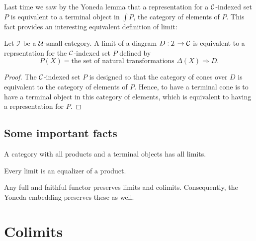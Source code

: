 Last time we saw by the Yoneda lemma that a representation for a \(\mathcal C\)-indexed set \(P\)
is equivalent to a terminal object in \(\int P\), the category of elements of \(P\).
This fact provides an interesting equivalent definition of limit:
\begin{proposition}
  Let \(\mathcal I\) be a \(\mathcal U\)-small category.
  A limit of a diagram \(D : \mathcal I \to \mathcal C\)
  is equivalent to a reprsentation for the \(\mathcal C\)-indexed set \(P\) defined by
  \[
     P(X) = \text{the set of natural transformations }\Delta(X) \Rightarrow D.
  \]
\end{proposition}
\begin{proof}
  The \(\mathcal C\)-indexed set \(P\) is designed so that
  the category of cones over \(D\) is equivalent to the category of elements of \(P\).
  Hence, to have a terminal cone is to have a terminal object in this category of elements,
which is equivalent to having a representation for \(P\).
\end{proof}


\subsection{Some important facts}

\begin{proposition}
  A category with all products and a terminal objects has all limits.
\end{proposition}

\begin{proposition}
  Every limit is an equalizer of a product.
\end{proposition}

\begin{proposition}
  Any full and faithful functor preserves limits and colimits.
  Consequently,
  the Yoneda embedding preserves these as well.
\end{proposition}

\section{Colimits}
